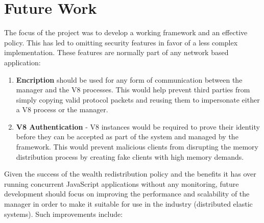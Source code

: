 \documentclass{l4proj}
\begin{document}
\section{Future Work}
\hspace*{3em} The focus of the project was to develop a working framework and an effective policy. This has led to omitting security features in favor of a less complex implementation. These features are normally part of any network based application: 
\begin{enumerate}
\item \textbf{Encription} should be used for any form of communication between the manager and the V8 processes. This would help prevent third parties from simply copying valid protocol packets and reusing them to impersonate either a V8 process or the manager.
\item \textbf{V8 Authentication} - V8 instances would be required to prove their identity before they can be accepted as part of the system and managed by the framework. This would prevent malicious clients from disrupting the memory distribution process by creating fake clients with high memory demands.
\end{enumerate}
\hspace*{3em} Given the success of the wealth redistribution policy and the benefits it has over running concurrent JavaScript applications without any monitoring, future development should focus on improving the performance and scalability of the manager in order to make it suitable for use in the industry (distributed elastic systems). Such improvements include:
\end{document}
